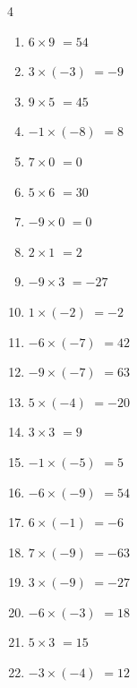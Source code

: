 \begin{multicols}{4}
\begin{enumerate}
  \item $6\times 9$
        $=54$

  \item $3\times (-3)$
        $=-9$

  \item $9\times 5$
        $=45$

  \item $-1\times (-8)$
        $=8$

  \item $7\times 0$
        $=0$

  \item $5\times 6$
        $=30$

  \item $-9\times 0$
        $=0$

  \item $2\times 1$
        $=2$

  \item $-9\times 3$
        $=-27$

  \item $1\times (-2)$
        $=-2$

  \item $-6\times (-7)$
        $=42$

  \item $-9\times (-7)$
        $=63$

  \item $5\times (-4)$
        $=-20$

  \item $3\times 3$
        $=9$

  \item $-1\times (-5)$
        $=5$

  \item $-6\times (-9)$
        $=54$

  \item $6\times (-1)$
        $=-6$

  \item $7\times (-9)$
        $=-63$

  \item $3\times (-9)$
        $=-27$

  \item $-6\times (-3)$
        $=18$

  \item $5\times 3$
        $=15$

  \item $-3\times (-4)$
        $=12$

\columnbreak %


\end{enumerate}
\end{multicols}
